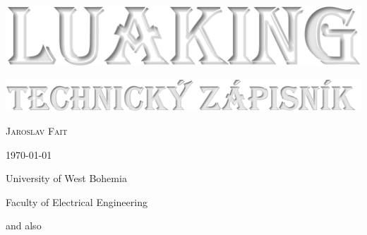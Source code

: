\begin{titlepage}
\BgThispage
  \begin{center}
    \vspace*{2cm}
    \includegraphics[width=0.9\linewidth]{luaking_title2.png}\par
    \vspace{1cm}
    \includegraphics[width=0.8\linewidth]{luaking_title3.png}\par
    \vspace{1cm}
    {\textcolor{black!5}{\Large\textsc{Jaroslav Fait}}\par}
    \vspace{1\baselineskip}
    {\textcolor{black!5}{\large\today}\par}
    \vfill
    {\textcolor{black!10}{University of West Bohemia}\par}
    {\textcolor{black!10}{Faculty of Electrical Engineering}\par}
    \vspace{0.5cm}
    {\textcolor{black!10}{\footnotesize\luatexbanner}\par}
    {\textcolor{black!10}{\footnotesize and also \KOMAScriptVersion}}
    \vspace*{0.5cm} 
  \end{center}
\end{titlepage}